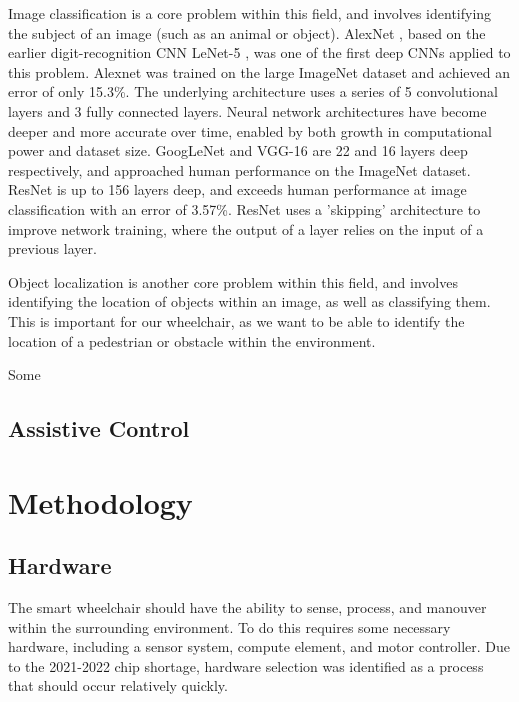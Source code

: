 \documentclass[12pt]{article}
\begin{document}
Image classification is a core problem within this field, and involves identifying the
subject of an image (such as an animal or object).
AlexNet \cite{krizhevskyImageNetClassificationDeep2012}, based on the earlier digit-recognition CNN LeNet-5
\cite{lecunGradientbasedLearningApplied1998}, was one of the first deep CNNs
applied to this problem. Alexnet was trained on the large ImageNet dataset \cite{jiadengImageNetLargescaleHierarchical2009}
and achieved an error of only 15.3\%. The underlying architecture uses a series of 5 convolutional
layers and 3 fully connected layers.
Neural network architectures have become deeper and more accurate over time, enabled by both
growth in computational power and dataset size. GoogLeNet \cite{szegedyGoingDeeperConvolutions2014}
and VGG-16 \cite{simonyanVeryDeepConvolutional2014} are 22 and 16 layers deep respectively, and approached
human performance on the ImageNet dataset. ResNet \cite{heDeepResidualLearning2016} is up to 156 layers deep,
and exceeds human performance at image classification with an error of 3.57\%.
ResNet uses a 'skipping' architecture to improve network training, where the output of a layer relies on
the input of a previous layer.

Object localization is another core problem within this field, and involves identifying the location of objects within an image,
as well as classifying them. This is important for our wheelchair, as we want to be able to identify the location of
a pedestrian or obstacle within the environment. %

Some 


\subsection{Assistive Control}


\pagebreak

\section{Methodology}
\subsection{Hardware}
The smart wheelchair should have the ability to sense, process, and manouver within the surrounding environment.
To do this requires some necessary hardware, including a sensor system, compute element, and motor controller.
Due to the 2021-2022 chip shortage, hardware selection was identified as a process that should occur relatively quickly.
\end{document}
